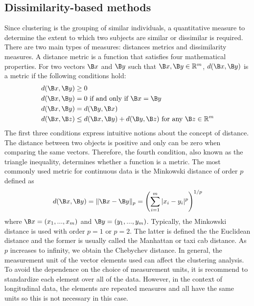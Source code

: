 \subsection{Dissimilarity-based methods}
Since clustering is the grouping of similar individuals, a quantitative measure to determine the extent to which two subjects are similar or dissimilar is required.  There are two main types of measures: distances metrics and dissimilarity measures. A distance metric is a function that satisfies four mathematical properties. For two vectors $\B x$ and $\B y$ such that $\B x,\B y\in\mathbb{R}^{m}$, $d(\B x,\B y)$ is a metric if the following conditions hold:
\begin{align*}
d(\B x,\B y)&\geq 0 \\
d(\B x,\B y) &= 0\text{ if and only if } \B x=\B y\\
d(\B x,\B y) &= d(\B y,\B x)\\
d(\B x,\B z) &\leq d(\B x,\B y) + d(\B y,\B z)\text{ for any }\B z\in \mathbb{R}^{m}
\end{align*}
The first three conditions express intuitive notions about the concept of distance. The distance between two objects is positive and only can be zero when comparing the same vectors. Therefore, the fourth condition, also known as the triangle inequality, determines whether a function is a metric. The most commonly used metric for continuous data is the Minkowski distance of order $p$ defined as
$$d(\B x,\B y) = \|\B x - \B y\|_{p} = \left(\sum^{m}_{i=1}|x_{i}-y_{i}|^{p}\right)^{1/p}$$
where $\B x = (x_{1},...,x_{m})$ and $\B y = (y_{1},...,y_{m})$. Typically, the Minkowski distance is used with order $p=1$ or $p=2$. The latter is defined the the Euclidean distance and the former is usually called the Manhattan or taxi cab distance. As $p$ increases to infinity, we obtain the Chebychev distance. In general, the measurement unit of the vector elements used can affect the clustering analysis. To avoid the dependence on the choice of measurement units, it is recommend to standardize each element over all of the data. However, in the context of longitudinal data, the elements are repeated measures and all have the same units so this is not necessary in this case. 

